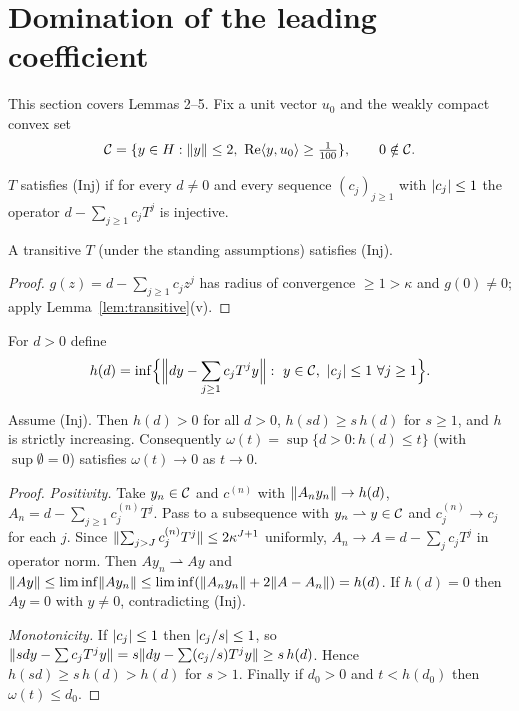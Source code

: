 \section{Domination of the leading coefficient}\label{sec:domination}

This section covers \paper{} Lemmas 2--5. Fix a unit vector $u_0$ and the weakly compact convex
set
\[
\cC=\{y\in H:\norm y\le2,\ \re\ip{y}{u_0}\ge\tfrac1{100}\},\qquad 0\notin\cC .
\]

\begin{definition}
$T$ satisfies \textup{(Inj)} if for every $d\ne0$ and every sequence $(c_j)_{j\ge1}$ with
$\lvert c_j\rvert\le1$ the operator $d-\sum_{j\ge1}c_jT^j$ is injective.
\end{definition}

\begin{lemma}\label{lem:inj}\stproved{}
A transitive $T$ (under the standing assumptions) satisfies \textup{(Inj)}.
\end{lemma}
\begin{proof}
$g(z)=d-\sum_{j\ge1}c_jz^j$ has radius of convergence $\ge1>\kappa$ and $g(0)\ne0$; apply
Lemma~\ref{lem:transitive}(v).
\end{proof}

For $d>0$ define
\[
h(d)=\inf\Bigl\{\Bigl\|dy-\sum_{j\ge1}c_jT^jy\Bigr\|:\ y\in\cC,\ \abs{c_j}\le1\ \forall j\ge1\Bigr\}.
\]

\begin{lemma}\label{lem:h}\stproved{}
Assume \textup{(Inj)}. Then $h(d)>0$ for all $d>0$, $h(sd)\ge s\,h(d)$ for $s\ge1$, and $h$ is
strictly increasing. Consequently
$\omega(t)=\sup\{d>0:h(d)\le t\}$ (with $\sup\emptyset=0$) satisfies $\omega(t)\to0$ as $t\to0$.
\end{lemma}
\begin{proof}
\emph{Positivity.} Take $y_n\in\mathcal{C}$ and $c^{(n)}$ with
$\lVert A_ny_n\rVert\to h(d)$, $A_n=d-\sum_{j\ge1}c^{(n)}_jT^j$. Pass to a subsequence with
$y_n\rightharpoonup y\in\mathcal{C}$ and $c^{(n)}_j\to c_j$ for each $j$. Since
$\lVert \sum_{j>J}c^{(n)}_jT^j\rVert\le2\kappa^{J+1}$ uniformly, $A_n\to A=d-\sum_jc_jT^j$ in operator
norm. Then $Ay_n\rightharpoonup Ay$ and
$\lVert Ay\rVert\le\liminf\lVert Ay_n\rVert\le\liminf(\lVert A_ny_n\rVert+2\lVert A-A_n\rVert)=h(d)$. If $h(d)=0$ then
$Ay=0$ with $y\ne0$, contradicting \textup{(Inj)}.

\emph{Monotonicity.} If $\lvert c_j\rvert\le1$ then $\lvert c_j/s\rvert\le1$, so
$\lVert sdy-\sum c_jT^jy\rVert=s\lVert dy-\sum(c_j/s)T^jy\rVert\ge s\,h(d)$. Hence $h(sd)\ge s\,h(d)>h(d)$ for
$s>1$. Finally if $d_0>0$ and $t<h(d_0)$ then $\omega(t)\le d_0$.
\end{proof}

